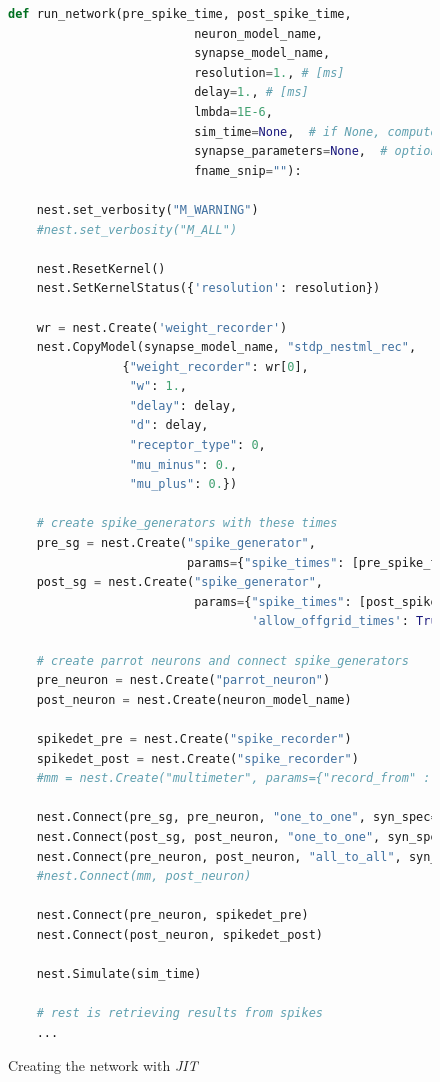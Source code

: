 \begin{figure}[ht!]
\centering
\caption{Creating the network with \emph{JIT}}

\begin{lstlisting}[language=Python]
def run_network(pre_spike_time, post_spike_time,
                          neuron_model_name,
                          synapse_model_name,
                          resolution=1., # [ms]
                          delay=1., # [ms]
                          lmbda=1E-6,
                          sim_time=None,  # if None, computed from pre and post spike times
                          synapse_parameters=None,  # optional dictionary passed to the synapse
                          fname_snip=""):

    nest.set_verbosity("M_WARNING")
    #nest.set_verbosity("M_ALL")

    nest.ResetKernel()
    nest.SetKernelStatus({'resolution': resolution})

    wr = nest.Create('weight_recorder')
    nest.CopyModel(synapse_model_name, "stdp_nestml_rec",
                {"weight_recorder": wr[0],
                 "w": 1.,
                 "delay": delay,
                 "d": delay,
                 "receptor_type": 0,
                 "mu_minus": 0.,
                 "mu_plus": 0.})

    # create spike_generators with these times
    pre_sg = nest.Create("spike_generator",
                         params={"spike_times": [pre_spike_time, sim_time - 10.]})
    post_sg = nest.Create("spike_generator",
                          params={"spike_times": [post_spike_time],
                                  'allow_offgrid_times': True})

    # create parrot neurons and connect spike_generators
    pre_neuron = nest.Create("parrot_neuron")
    post_neuron = nest.Create(neuron_model_name)

    spikedet_pre = nest.Create("spike_recorder")
    spikedet_post = nest.Create("spike_recorder")
    #mm = nest.Create("multimeter", params={"record_from" : ["V_m"]})

    nest.Connect(pre_sg, pre_neuron, "one_to_one", syn_spec={"delay": 1.})
    nest.Connect(post_sg, post_neuron, "one_to_one", syn_spec={"delay": 1., "weight": 9999.})
    nest.Connect(pre_neuron, post_neuron, "all_to_all", syn_spec={'synapse_model': 'stdp_nestml_rec', "post_ports": ["post_spikes"]})
    #nest.Connect(mm, post_neuron)

    nest.Connect(pre_neuron, spikedet_pre)
    nest.Connect(post_neuron, spikedet_post)
    
    nest.Simulate(sim_time)
    
    # rest is retrieving results from spikes
    ...

\end{lstlisting}
\label{fig:build_network_with_jit}
\end{figure}

\cleardoublepage
